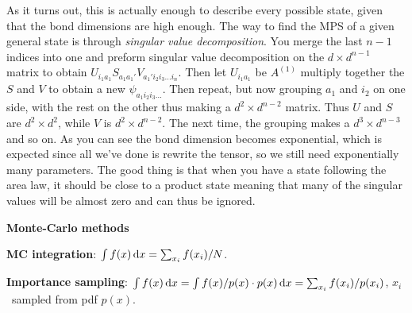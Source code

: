 \documentclass[10pt,landscape]{article}
\newcommand{\topiccolor}{green}
\newcommand{\topic}[2]{%
	\renewcommand{\topiccolor}{#1}
	\begin{tcolorbox}[boxsep=0.5mm, left=1mm, right=1mm, top=0mm, bottom=0mm,
		colback=#1!30, colframe=#1, arc is angular]%
		\centering \textbf{#2}%
	\end{tcolorbox}%
}
\newcommand{\cbf}[1]{\textcolor{\topiccolor!80!black}{\textbf{#1}}}
\begin{document}
\begin{multicols*}{3}
\begin{center}
\end{center}

As it turns out, this is actually enough to describe every possible state,
given that the bond dimensions are high enough.
The way to find the MPS of a given general state is through \emph{singular value
decomposition}.
You merge the last $n-1$ indices into one and preform singular value
decomposition on the $d\times d^{n-1}$ matrix to obtain
$U_{i_1 a_1} S_{a_1 a_1'} V_{a_1'i_2i_3\ldots i_n}$.
Then let $U_{i_1 a_1}$ be $A^{(1)}$ multiply together the $S$ and $V$ to obtain
a new $\psi_{a_1 i_2 i_3\ldots}$.
Then repeat, but now grouping $a_1$ and $i_2$ on one side, with the rest on the
other thus making a $d^2 \times d^{n-2}$ matrix.
Thus $U$ and $S$ are $d^2 \times d^2$, while $V$ is $d^2 \times d^{n-2}$.
The next time, the grouping makes a $d^3 \times d^{n-3}$ and so on.
As you can see the bond dimension becomes exponential, which is expected since
all we've done is rewrite the tensor, so we still need exponentially many
parameters.
The good thing is that when you have a state following the area law, it should
be close to a product state meaning that many of the singular values will be
almost zero and can thus be ignored.

\topic{red}{Monte-Carlo methods}

\cbf{MC integration}:
$\int f(x) \dl x = \sum_{x_i} f(x_i)/N$.

\cbf{Importance sampling}:
$\int f(x) \dl x = \int f(x)/p(x) \cdot p(x) \dl x = \sum_{x_i} f(x_i) / p(x_i)$,
$x_i$ sampled from pdf $p(x)$.


\end{multicols*}
\end{document}
